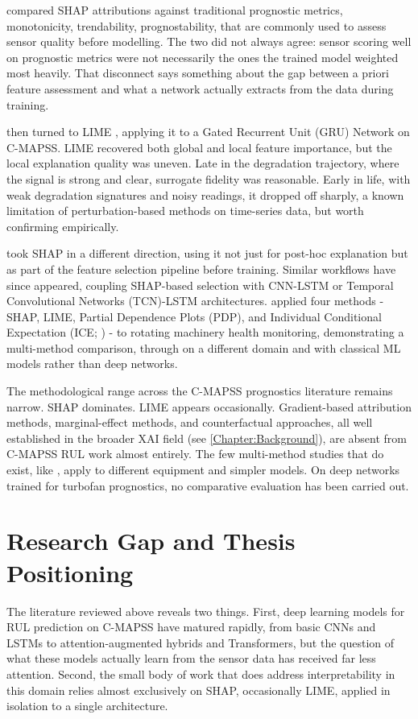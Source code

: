 \cite{Baptista2022} compared SHAP attributions against traditional prognostic metrics, monotonicity, trendability, prognostability, that are commonly used to assess sensor quality before modelling. The two did not always agree: sensor scoring well on prognostic metrics were not necessarily the ones the trained model weighted most heavily. That disconnect says something about the gap between a priori feature assessment and what a network actually extracts from the data during training.

\cite{Baptista2024} then turned to LIME \citep{ribeiro2016modelagnosticinterpretabilitymachinelearning}, applying it to a Gated Recurrent Unit (GRU) Network on C-MAPSS. LIME recovered both global and local feature importance, but the local explanation quality was uneven. Late in the degradation trajectory, where the signal is strong and clear, surrogate fidelity was reasonable. Early in life, with weak degradation signatures and noisy readings, it dropped off sharply, a known limitation of perturbation-based methods on time-series data, but worth confirming empirically.

\cite{Alomari2023} took SHAP in a different direction, using it not just for post-hoc explanation but as part of the feature selection pipeline before training. Similar workflows have since appeared, coupling SHAP-based selection with CNN-LSTM or Temporal Convolutional Networks (TCN)-LSTM architectures. \cite{Gawde2024} applied four methods - SHAP, LIME, Partial Dependence Plots (PDP), and Individual Conditional Expectation (ICE; \cite{goldstein_peeking_2015}) - to rotating machinery health monitoring, demonstrating a multi-method comparison, through on a different domain and with classical ML models rather than deep networks.

The methodological range across the C-MAPSS prognostics literature remains narrow. SHAP dominates. LIME appears occasionally. Gradient-based attribution methods, marginal-effect methods, and counterfactual approaches, all well established in the broader XAI field (see \ref{Chapter:Background}), are absent from C-MAPSS RUL work almost entirely. The few multi-method studies that do exist, like \cite{Gawde2024}, apply to different equipment and simpler models. On deep networks trained for turbofan prognostics, no comparative evaluation has been carried out.

\section{Research Gap and Thesis Positioning}
The literature reviewed above reveals two things. First, deep learning models for RUL prediction on C-MAPSS have matured rapidly, from basic CNNs and LSTMs to attention-augmented hybrids and Transformers, but the question of what these models actually learn from the sensor data has received far less attention. Second, the small body of work that does address interpretability in this domain relies almost exclusively on SHAP, occasionally LIME, applied in isolation to a single architecture.

